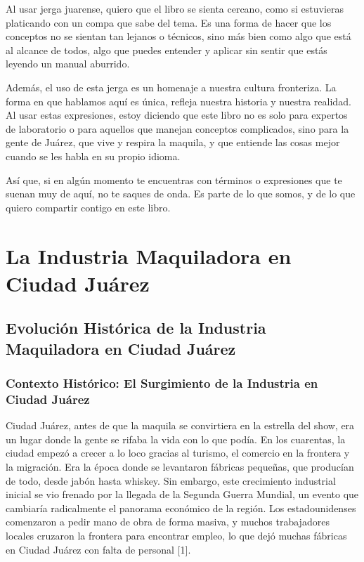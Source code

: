 \documentclass[
  10pt,
  letterpaper,
]{book}
\begin{document}
Al usar jerga juarense, quiero que el libro se sienta cercano, como si
estuvieras platicando con un compa que sabe del tema. Es una forma de
hacer que los conceptos no se sientan tan lejanos o técnicos, sino más
bien como algo que está al alcance de todos, algo que puedes entender y
aplicar sin sentir que estás leyendo un manual aburrido.

Además, el uso de esta jerga es un homenaje a nuestra cultura
fronteriza. La forma en que hablamos aquí es única, refleja nuestra
historia y nuestra realidad. Al usar estas expresiones, estoy diciendo
que este libro no es solo para expertos de laboratorio o para aquellos
que manejan conceptos complicados, sino para la gente de Juárez, que
vive y respira la maquila, y que entiende las cosas mejor cuando se les
habla en su propio idioma.

Así que, si en algún momento te encuentras con términos o expresiones
que te suenan muy de aquí, no te saques de onda. Es parte de lo que
somos, y de lo que quiero compartir contigo en este libro.


\chapter{La Industria Maquiladora en Ciudad
Juárez}\label{la-industria-maquiladora-en-ciudad-juuxe1rez}

\section{Evolución Histórica de la Industria Maquiladora en Ciudad
Juárez}\label{evoluciuxf3n-histuxf3rica-de-la-industria-maquiladora-en-ciudad-juuxe1rez}

\subsection{Contexto Histórico: El Surgimiento de la Industria en Ciudad
Juárez}\label{contexto-histuxf3rico-el-surgimiento-de-la-industria-en-ciudad-juuxe1rez}

Ciudad Juárez, antes de que la maquila se convirtiera en la estrella del
show, era un lugar donde la gente se rifaba la vida con lo que podía. En
los cuarentas, la ciudad empezó a crecer a lo loco gracias al turismo,
el comercio en la frontera y la migración. Era la época donde se
levantaron fábricas pequeñas, que producían de todo, desde jabón hasta
whiskey. Sin embargo, este crecimiento industrial inicial se vio frenado
por la llegada de la Segunda Guerra Mundial, un evento que cambiaría
radicalmente el panorama económico de la región. Los estadounidenses
comenzaron a pedir mano de obra de forma masiva, y muchos trabajadores
locales cruzaron la frontera para encontrar empleo, lo que dejó muchas
fábricas en Ciudad Juárez con falta de personal {[}1{]}.
\end{document}
